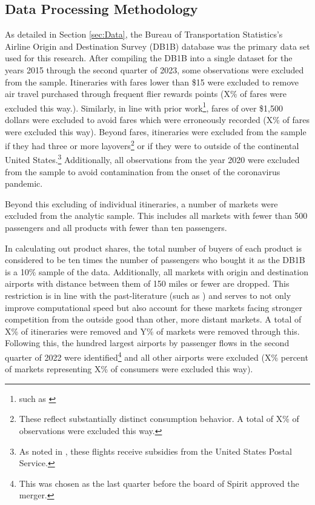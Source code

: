 \documentclass{article}
\begin{document}
	\pagebreak 
	 
	
	\FloatBarrier
	
\pagebreak	\begin{appendices}
	
	\section{Data Processing Methodology}
	\label{sec:DataProcessing}
	As detailed in Section \ref{sec:Data},	the Bureau of Transportation Statistics's Airline Origin and Destination Survey (DB1B) database was the primary data set used for this research. After compiling the DB1B into a single dataset for the years 2015 through the second quarter of 2023, some observations were excluded from the sample. Itineraries with fares lower than \$15 were excluded to remove air travel purchased through frequent flier rewards points ({X}\% of fares were excluded this way.). Similarly, in line with prior work\footnote{such as \citet{berry_tracing_2010}}, fares of over \$1,500 dollars were excluded to avoid fares which were erroneously recorded (X\% of fares were excluded this way). Beyond fares, itineraries were excluded from the sample if they had three or more layovers\footnote{These reflect substantially distinct consumption behavior. A total of X\% of observations were excluded this way.} or if they were to outside of the continental United States.\footnote{As noted in \citet{ciliberto_market_2021}, these flights receive subsidies from the United States Postal Service.} Additionally, all observations from the year 2020 were excluded from the sample to avoid contamination from the onset of the coronavirus pandemic.
	
	Beyond this excluding of individual itineraries, a number of markets were excluded from the analytic sample. This includes all markets with fewer than 500 passengers and all products with fewer than ten passengers. 
	
	In calculating out product shares, the total number of buyers of each product is considered to be ten times the number of passengers who bought it as the DB1B is a 10\% sample of the data. Additionally, all markets with origin and destination airports with distance between them of 150 miles or fewer are dropped. This restriction is in line with the past-literature (such as \citet{ciliberto_does_2014}) and serves to not only improve computational speed but also account for these markets facing stronger competition from the outside good than other, more distant markets. A total of {X}\% of itineraries were removed and Y\% of markets were removed through this. Following this, the hundred largest airports by passenger flows in the second quarter of 2022 were identified\footnote{This was chosen as the last quarter before the board of Spirit approved the merger.} and all other airports were excluded (X\% percent of markets representing X\% of consumers were excluded this way). 
	

\end{appendices}
\end{document}

